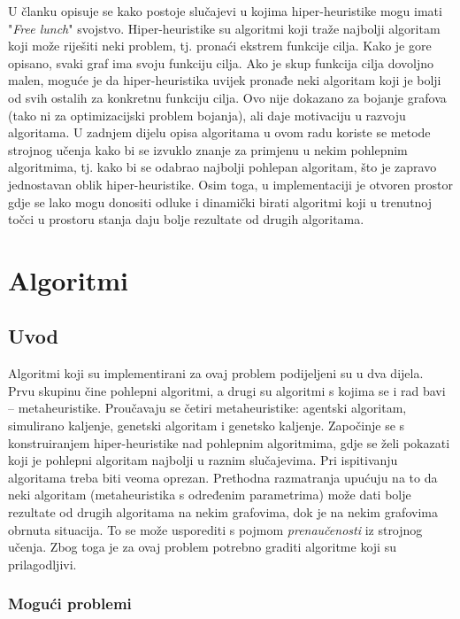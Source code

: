 \documentclass[times, utf8, diplomski, numeric]{fer}
\begin{document}
U članku \cite{lit9} opisuje se kako postoje slučajevi u kojima hiper-heuristike mogu imati "\emph{Free lunch}" svojstvo. Hiper-heuristike su algoritmi koji traže najbolji algoritam koji može riješiti neki problem, tj. pronaći ekstrem funkcije cilja. Kako je gore opisano, svaki graf ima svoju funkciju cilja. Ako je skup funkcija cilja dovoljno malen, moguće je da hiper-heuristika uvijek pronađe neki algoritam koji je bolji od svih ostalih za konkretnu funkciju cilja. Ovo nije dokazano za bojanje grafova (tako ni za optimizacijski problem bojanja), ali daje motivaciju u razvoju algoritama. U zadnjem dijelu opisa algoritama u ovom radu koriste se metode strojnog učenja kako bi se izvuklo znanje za primjenu u nekim pohlepnim algoritmima, tj. kako bi se odabrao najbolji pohlepan algoritam, što je zapravo jednostavan oblik hiper-heuristike. Osim toga, u implementaciji je otvoren prostor gdje se lako mogu donositi odluke i dinamički birati algoritmi koji u trenutnoj točci u prostoru stanja daju bolje rezultate od drugih algoritama.

\chapter{Algoritmi}

\section{Uvod}

Algoritmi koji su implementirani za ovaj problem podijeljeni su u dva dijela. Prvu skupinu čine pohlepni algoritmi, a drugi su algoritmi s kojima se i rad bavi -- metaheuristike. Proučavaju se četiri metaheuristike: agentski algoritam, simulirano kaljenje, genetski algoritam i genetsko kaljenje. Započinje se s konstruiranjem hiper-heuristike nad pohlepnim algoritmima, gdje se želi pokazati koji je pohlepni algoritam najbolji u raznim slučajevima. Pri ispitivanju algoritama treba biti veoma oprezan. Prethodna razmatranja upućuju na to da neki algoritam (metaheuristika s određenim parametrima) može dati bolje rezultate od drugih algoritama na nekim grafovima, dok je na nekim grafovima obrnuta situacija. To se može usporediti s pojmom \emph{prenaučenosti} iz strojnog učenja. Zbog toga je za ovaj problem potrebno graditi algoritme koji su prilagodljivi.

\subsection{Mogući problemi}
\end{document}
